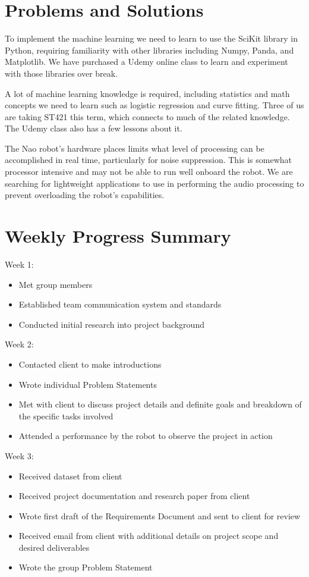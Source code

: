 \documentclass[onecolumn, draftclsnofoot,10pt, compsoc]{IEEEtran}
\begin{document}
\section{Problems and Solutions}
To implement the machine learning we need to learn to use the SciKit library in Python, requiring familiarity with other libraries including Numpy, Panda, and Matplotlib. We have purchased a Udemy online class to learn and experiment with those libraries over break.\par
\vspace{.3cm}
\noindent A lot of machine learning knowledge is required, including statistics and math concepts we need to learn such as logistic regression and curve fitting. Three of us are taking ST421 this term, which connects to much of the related knowledge. The Udemy class also has a few lessons about it.\par
\vspace{.3cm}
\noindent The Nao robot's hardware places limits what level of processing can be accomplished in real time, particularly for noise suppression. This is somewhat processor intensive and may not be able to run well onboard the robot. We are searching for lightweight applications to use in performing the audio processing to prevent overloading the robot's capabilities.

\section{Weekly Progress Summary}
Week 1:
\begin{itemize}
\item Met group members
\item Established team communication system and standards
\item Conducted initial research into project background
\end{itemize}

Week 2:
\begin{itemize}
\item Contacted client to make introductions
\item Wrote individual Problem Statements
\item Met with client to discuss project details and definite goals and breakdown of the specific tasks involved
\item Attended a performance by the robot to observe the project in action
\end{itemize}

Week 3:
\begin{itemize}
\item Received dataset from client
\item Received project documentation and research paper from client
\item Wrote first draft of the Requirements Document and sent to client for review
\item Received email from client with additional details on project scope and desired deliverables
\item Wrote the group Problem Statement
\end{itemize}
\end{document}
